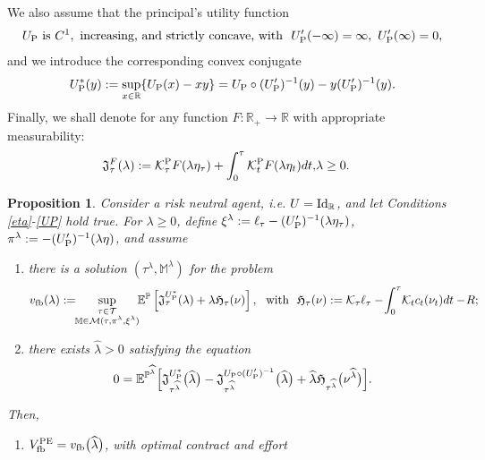 \documentclass[11pt,a4paper]{article}
\numberwithin{equation}{section}
\def\dbE{\mathbb{E}}
\def\dbM{\mathbb{M}}
\def\dbP{\mathbb{P}}
\def\dbR{\mathbb{R}}
\newcommand{\cK}{\mathcal{K}}
\newcommand{\cM}{\mathcal{M}}
\newcommand{\cT}{\mathcal{T}}
\newcommand{\bea}{\begin{eqnarray}}
\newcommand{\eea}{\end{eqnarray}}
\newcommand{\beaa}{\begin{eqnarray*}}
\newcommand{\eeaa}{\end{eqnarray*}}
\newtheorem{proposition}[theorem]{Proposition}
\theoremstyle{definition}
\begin{document}
We also assume that the principal's utility function 
 \bea\label{UP}
 U_{\rm P}
 ~\mbox{is}~C^1,
 ~\mbox{increasing, and strictly concave, with}~
 ~U_{\rm P}'(-\infty)=\infty,
 ~U_{\rm P}'(\infty)=0,
 \eea 
and we introduce the corresponding convex conjugate
 $$
 U_{\rm P}^*(y)
 :=
 \sup_{x\in\dbR}\{U_{\rm P}(x)-xy\}
 =
 U_{\rm P}\circ(U'_{\rm P})^{-1}(y)-y(U'_{\rm P})^{-1}(y).
 $$
Finally, we shall denote for any function $F:\dbR_+\longrightarrow\dbR$ with appropriate measurability:
 \beaa
 \mathfrak{J}^F_\tau(\lambda)
   :=
 \cK^{\rm P}_\tau F(\lambda\eta_\tau)
 +\int_0^\tau\cK^{\rm P}_tF(\lambda\eta_t)dt,
 &\lambda\ge 0.&
 \eeaa

\begin{proposition} 
Consider a risk neutral agent, i.e. $U={\rm Id}_\dbR$, and let Conditions \eqref{eta}-\eqref{UP} hold true. 
For $\lambda\geq 0$, define $\xi^{\lambda}:=\ell_\tau-(U_{\rm P}')^{-1}(\lambda\eta_\tau)$, $\pi^{\lambda}:=-(U_{\rm P}')^{-1}(\lambda\eta)$, and assume
\begin{enumerate}[$({\rm C}1)$]
 \item  there is a solution $(\tau^{\lambda},\dbM^{\lambda})$ for the problem
          \begin{equation*}
            v_{\rm fb}(\lambda)
              := \!\!\sup_{\substack{\tau\in\cT  \\  \dbM\in\cM(\tau,\pi^{\lambda},\xi^{\lambda})}} \!\!
                     \dbE^{\dbP}\left[\mathfrak{J}^{U_{\rm P}^*}_\tau(\lambda) + \lambda \mathfrak{H}_\tau(\nu) \right],
               \,\, \mbox{ with } \,\,
            \mathfrak{H}_\tau(\nu)
               := 
              \cK_\tau\ell_\tau- \!\int_0^\tau \!\cK_t c_t(\nu_t)dt -\!R;
          \end{equation*}    
 \item  there exists $\widehat\lambda>0$ satisfying the equation
          \beaa
            0
             =
           \dbE^{\dbP^{\widehat\lambda}}
               \Big[\mathfrak{J}^{U_{\rm P}^*}_{\tau^{\widehat\lambda}}\big(\widehat\lambda\big)
                      -\mathfrak{J}^{U_{\rm P}\circ(U_{\rm P}')^{-1}}_{\tau^{\widehat\lambda}}\big(\widehat\lambda\big)
                      + \widehat\lambda \mathfrak{H}_{\tau^{\widehat\lambda}}\big(\nu^{\widehat\lambda}\big)
               \Big].
          \eeaa
\end{enumerate}
Then, 
\begin{enumerate}[{\rm (i)}]
 \item $V^{\rm PE}_{\rm fb}=v_{\rm fb}\big(\widehat\lambda\big)$, with optimal contract and effort 

\end{enumerate}
\end{proposition}
\end{document}
